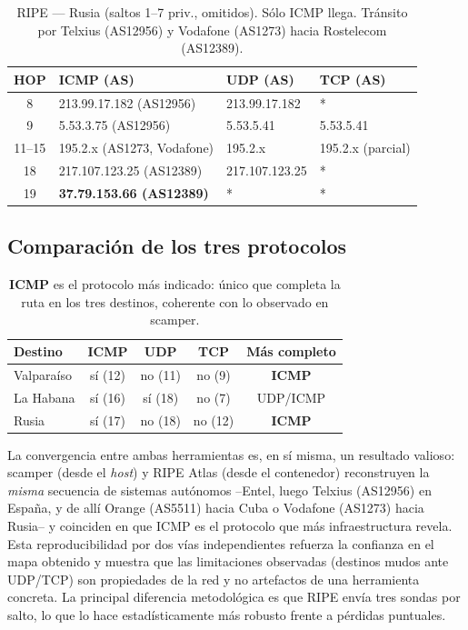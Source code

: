 \documentclass[11pt,a4paper]{article}
\begin{document}
\begin{table}[H]
\centering\footnotesize
\begin{tabular}{c|lll}
\toprule
HOP & ICMP (AS) & UDP (AS) & TCP (AS) \\
\midrule
8 & 213.99.17.182 (AS12956) & 213.99.17.182 & * \\
9 & 5.53.3.75 (AS12956) & 5.53.5.41 & 5.53.5.41 \\
11--15 & 195.2.x (AS1273, Vodafone) & 195.2.x & 195.2.x (parcial) \\
18 & 217.107.123.25 (AS12389) & 217.107.123.25 & * \\
19 & \textbf{37.79.153.66 (AS12389)} & * & * \\
\bottomrule
\end{tabular}
\caption{RIPE --- Rusia (saltos 1--7 priv., omitidos). Sólo ICMP llega. Tránsito por Telxius
(AS12956) y Vodafone (AS1273) hacia Rostelecom (AS12389).}
\end{table}

\subsection{Comparación de los tres protocolos}
\begin{table}[H]
\centering\small
\begin{tabular}{lccc c}
\toprule
Destino & ICMP & UDP & TCP & Más completo \\
\midrule
Valparaíso & sí (12) & no (11) & no (9) & \textbf{ICMP} \\
La Habana & sí (16) & sí (18) & no (7) & UDP/ICMP \\
Rusia & sí (17) & no (18) & no (12) & \textbf{ICMP} \\
\bottomrule
\end{tabular}
\caption{\textbf{ICMP} es el protocolo más indicado: único que completa la ruta en los tres
destinos, coherente con lo observado en scamper.}
\end{table}

La convergencia entre ambas herramientas es, en sí misma, un resultado valioso: scamper (desde el
\emph{host}) y RIPE Atlas (desde el contenedor) reconstruyen la \emph{misma} secuencia de sistemas
autónomos --Entel, luego Telxius (AS12956) en España, y de allí Orange (AS5511) hacia Cuba o
Vodafone (AS1273) hacia Rusia-- y coinciden en que ICMP es el protocolo que más infraestructura
revela. Esta reproducibilidad por dos vías independientes refuerza la confianza en el mapa
obtenido y muestra que las limitaciones observadas (destinos mudos ante UDP/TCP) son propiedades
de la red y no artefactos de una herramienta concreta. La principal diferencia metodológica es
que RIPE envía tres sondas por salto, lo que lo hace estadísticamente más robusto frente a
pérdidas puntuales.
\end{document}
